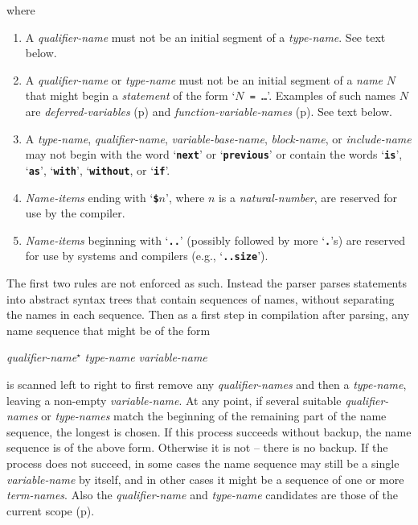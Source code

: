 \documentclass[12pt]{article}
\newcommand{\TT}[1]{{\tt \bfseries #1}}
\newcommand{\pagref}[1]{p\pageref{#1}}
\newcommand{\STAR}{{\Large $^\star$}}
\newcommand{\TMP}{\$}			%
\newenvironment{indpar}[1][0.3in]%
	{\begin{list}{}%
		     {\setlength{\itemsep}{0in}%
		      \setlength{\topsep}{0in}%
		      \setlength{\parsep}{1ex}%
		      \setlength{\labelwidth}{#1}%
		      \setlength{\leftmargin}{#1}%
		      \addtolength{\leftmargin}{\labelsep}}%
	 \item}%
	{\end{list}}
\begin{document}
\begin{indpar}
where
\begin{enumerate}
\item
A {\em qualifier-name} must not be an initial segment
of a {\em type-name}.  See text below.
\item
A {\em qualifier-name} or {\em type-name} must not be an initial segment
of a {\em name} $N$ that might begin a {\em statement} of
the form `{\tt $N$ = \ldots}'.  Examples of such names $N$
are {\em deferred-variables} (\pagref{DEFERRED-VARIABLE})
and {\em function-variable-names} (\pagref{FUNCTION-VARIABLE-NAME}).
See text below.
\label{TYPE-NAME-RULE}
\item
A {\em type-name}, {\em qualifier-name}, {\em variable-base-name},
{\em block-name}, or {\em include-name}
may not begin with the word `\TT{next}' or `\TT{previous}' or
contain the words `\TT{is}', `\TT{as}', `\TT{with}', `\TT{without},
or `\TT{if}'.
\item
{\em Name-items} ending with `\TT{\TMP$n$}',
where $n$ is a {\em natural-number}, are
reserved for use by the compiler.
\item
{\em Name-items} beginning with `\TT{..}' (possibly followed by more
`\TT{.}'s) are reserved
for use by systems and compilers (e.g., `\TT{..size}').
\end{enumerate}
\end{indpar}

The first two rules are not enforced as such.  Instead the parser
parses statements into abstract syntax trees that contain
sequences of names, without separating the names in each sequence.
Then as a first step in compilation after parsing,
any name sequence that might be of the form
\begin{center}
{\em qualifier-name}\STAR{} {\em type-name} {\em variable-name}
\end{center}
is scanned left to right to first remove any {\em qualifier-names}
and then a {\em type-name}, leaving a non-empty {\em variable-name}.
At any point, if several suitable {\em qualifier-names} or
{\em type-names} match the
beginning of the remaining part of the name sequence, the longest
is chosen.  If this process succeeds without backup, the name
sequence is of the above form.  Otherwise it is not -- there is
no backup.  If the process does not succeed, in some
cases the name sequence may still be a single {\em variable-name}
by itself, and in other cases it might be a sequence of one or
more {\em term-names}.
Also the {\em qualifier-name} and {\em type-name}
candidates are those of the current scope (\pagref{SCOPE}).
\end{document}
